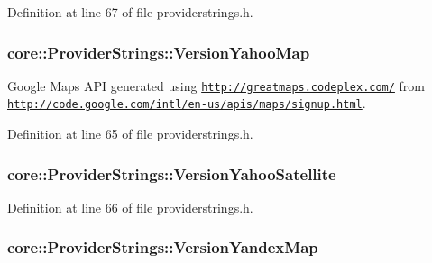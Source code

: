 \-Definition at line 67 of file providerstrings.\-h.

\hypertarget{group___o_p_map_widget_ga3846cf6d2412f72a3c10be8d4066f7fc}{
\subsubsection[{\-Version\-Yahoo\-Map}]{ {\bf core\-::\-Provider\-Strings\-::\-Version\-Yahoo\-Map}}}\label{group___o_p_map_widget_ga3846cf6d2412f72a3c10be8d4066f7fc}


\-Google \-Maps \-A\-P\-I generated using \href{http://greatmaps.codeplex.com/}{\tt http\-://greatmaps.\-codeplex.\-com/} from \href{http://code.google.com/intl/en-us/apis/maps/signup.html}{\tt http\-://code.\-google.\-com/intl/en-\/us/apis/maps/signup.\-html}. 



\-Definition at line 65 of file providerstrings.\-h.

\hypertarget{group___o_p_map_widget_ga41e9afc6aa6f634642d2aaa246c1a60e}{
\subsubsection[{\-Version\-Yahoo\-Satellite}]{ {\bf core\-::\-Provider\-Strings\-::\-Version\-Yahoo\-Satellite}}}\label{group___o_p_map_widget_ga41e9afc6aa6f634642d2aaa246c1a60e}


\-Definition at line 66 of file providerstrings.\-h.

\hypertarget{group___o_p_map_widget_ga4e8dc0424dc67c6a4248f5bb6a770403}{
\subsubsection[{\-Version\-Yandex\-Map}]{ {\bf core\-::\-Provider\-Strings\-::\-Version\-Yandex\-Map}}}\label{group___o_p_map_widget_ga4e8dc0424dc67c6a4248f5bb6a770403}


